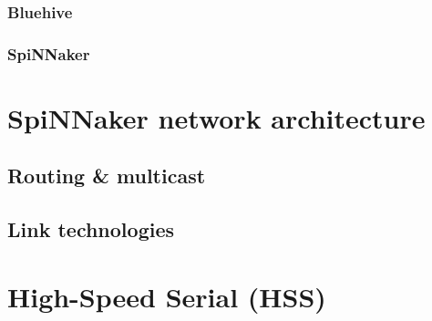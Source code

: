 			
			\subsubsection{Bluehive}
				
			
			\subsubsection{SpiNNaker}
				
	
	
	\section{SpiNNaker network architecture}
		\label{sec:spinnaker}
		
		
		\subsection{Routing \& multicast}
			
		
		\subsection{Link technologies}
			
	
	\section{High-Speed Serial (HSS)}
		\label{sec:high-speed-serial}
		
